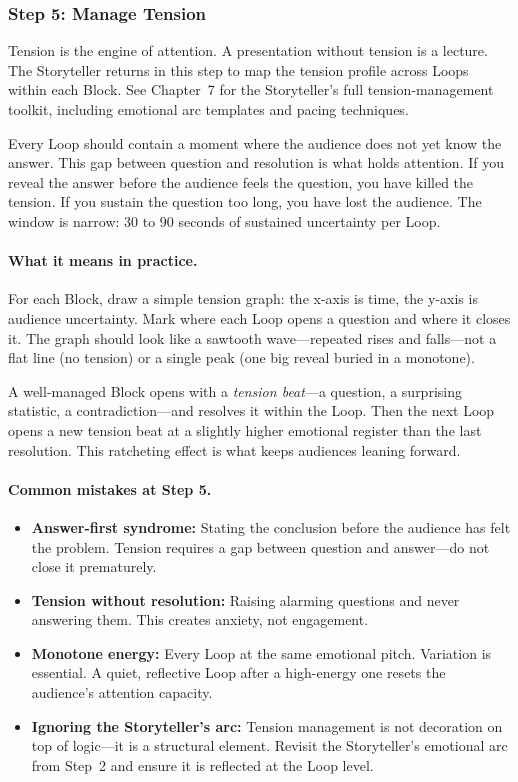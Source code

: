 \subsubsection{Step 5: Manage Tension}

Tension is the engine of attention. A presentation without tension is a lecture. The Storyteller returns in this step to map the tension profile across Loops within each Block. See Chapter~7 for the Storyteller's full tension-management toolkit, including emotional arc templates and pacing techniques.

\begin{insightbox}
Every Loop should contain a moment where the audience does not yet know the answer. This gap between question and resolution is what holds attention. If you reveal the answer before the audience feels the question, you have killed the tension. If you sustain the question too long, you have lost the audience. The window is narrow: 30 to 90 seconds of sustained uncertainty per Loop.
\end{insightbox}

\paragraph{What it means in practice.} For each Block, draw a simple tension graph: the x-axis is time, the y-axis is audience uncertainty. Mark where each Loop opens a question and where it closes it. The graph should look like a sawtooth wave---repeated rises and falls---not a flat line (no tension) or a single peak (one big reveal buried in a monotone).

A well-managed Block opens with a \emph{tension beat}---a question, a surprising statistic, a contradiction---and resolves it within the Loop. Then the next Loop opens a new tension beat at a slightly higher emotional register than the last resolution. This ratcheting effect is what keeps audiences leaning forward.

\paragraph{Common mistakes at Step 5.}
\begin{itemize}
  \item \textbf{Answer-first syndrome:} Stating the conclusion before the audience has felt the problem. Tension requires a gap between question and answer---do not close it prematurely.
  \item \textbf{Tension without resolution:} Raising alarming questions and never answering them. This creates anxiety, not engagement.
  \item \textbf{Monotone energy:} Every Loop at the same emotional pitch. Variation is essential. A quiet, reflective Loop after a high-energy one resets the audience's attention capacity.
  \item \textbf{Ignoring the Storyteller's arc:} Tension management is not decoration on top of logic---it is a structural element. Revisit the Storyteller's emotional arc from Step~2 and ensure it is reflected at the Loop level.
\end{itemize}

